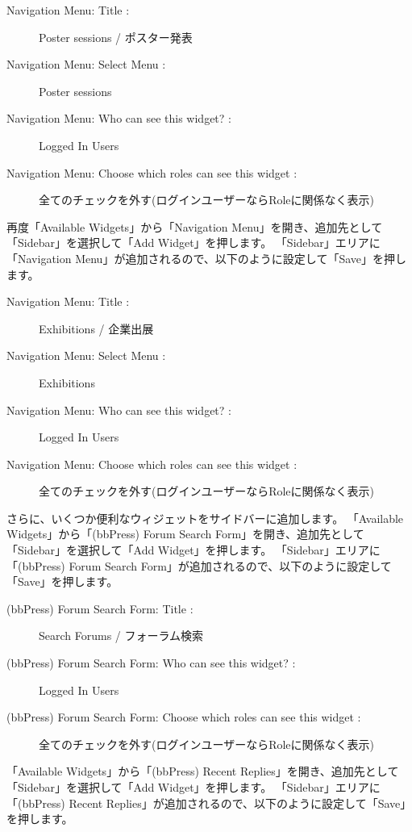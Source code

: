 \documentclass[titlepage,10pt,a4paper,uplatex]{jsbook}
\begin{document}
\begin{description}
\item[Navigation Menu: Title : ] Poster sessions / ポスター発表
\item[Navigation Menu: Select Menu : ] Poster sessions
\item[Navigation Menu: Who can see this widget? : ] Logged In Users
\item[Navigation Menu: Choose which roles can see this widget : ] 全てのチェックを外す(ログインユーザーならRoleに関係なく表示)
\end{description}

再度「Available Widgets」から「Navigation Menu」を開き、追加先として「Sidebar」を選択して「Add Widget」を押します。
「Sidebar」エリアに「Navigation Menu」が追加されるので、以下のように設定して「Save」を押します。

\begin{description}
\item[Navigation Menu: Title : ] Exhibitions / 企業出展
\item[Navigation Menu: Select Menu : ] Exhibitions
\item[Navigation Menu: Who can see this widget? : ] Logged In Users
\item[Navigation Menu: Choose which roles can see this widget : ] 全てのチェックを外す(ログインユーザーならRoleに関係なく表示)
\end{description}

さらに、いくつか便利なウィジェットをサイドバーに追加します。
「Available Widgets」から「(bbPress) Forum Search Form」を開き、追加先として「Sidebar」を選択して「Add Widget」を押します。
「Sidebar」エリアに「(bbPress) Forum Search Form」が追加されるので、以下のように設定して「Save」を押します。

\begin{description}
\item[(bbPress) Forum Search Form: Title : ] Search Forums / フォーラム検索
\item[(bbPress) Forum Search Form: Who can see this widget? : ] Logged In Users
\item[(bbPress) Forum Search Form: Choose which roles can see this widget : ] 全てのチェックを外す(ログインユーザーならRoleに関係なく表示)
\end{description}

「Available Widgets」から「(bbPress) Recent Replies」を開き、追加先として「Sidebar」を選択して「Add Widget」を押します。
「Sidebar」エリアに「(bbPress) Recent Replies」が追加されるので、以下のように設定して「Save」を押します。
\end{document}
